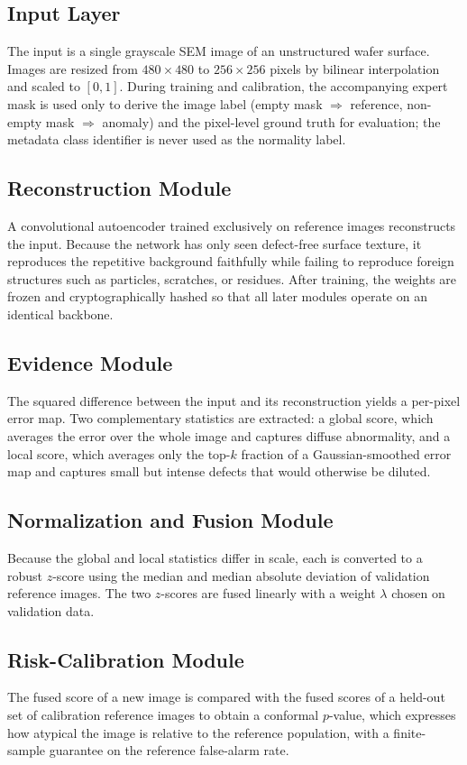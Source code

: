 \documentclass[conference]{IEEEtran}
\begin{document}
\subsection{Input Layer}
The input is a single grayscale SEM image of an unstructured wafer surface. Images are resized from $480\times480$ to $256\times256$ pixels by bilinear interpolation and scaled to $[0,1]$. During training and calibration, the accompanying expert mask is used only to derive the image label (empty mask $\Rightarrow$ reference, non-empty mask $\Rightarrow$ anomaly) and the pixel-level ground truth for evaluation; the metadata class identifier is never used as the normality label.

\subsection{Reconstruction Module}
A convolutional autoencoder trained exclusively on reference images reconstructs the input. Because the network has only seen defect-free surface texture, it reproduces the repetitive background faithfully while failing to reproduce foreign structures such as particles, scratches, or residues. After training, the weights are frozen and cryptographically hashed so that all later modules operate on an identical backbone.

\subsection{Evidence Module}
The squared difference between the input and its reconstruction yields a per-pixel error map. Two complementary statistics are extracted: a global score, which averages the error over the whole image and captures diffuse abnormality, and a local score, which averages only the top-$k$ fraction of a Gaussian-smoothed error map and captures small but intense defects that would otherwise be diluted.

\subsection{Normalization and Fusion Module}
Because the global and local statistics differ in scale, each is converted to a robust $z$-score using the median and median absolute deviation of validation reference images. The two $z$-scores are fused linearly with a weight $\lambda$ chosen on validation data.

\subsection{Risk-Calibration Module}
The fused score of a new image is compared with the fused scores of a held-out set of calibration reference images to obtain a conformal $p$-value, which expresses how atypical the image is relative to the reference population, with a finite-sample guarantee on the reference false-alarm rate.
\end{document}
